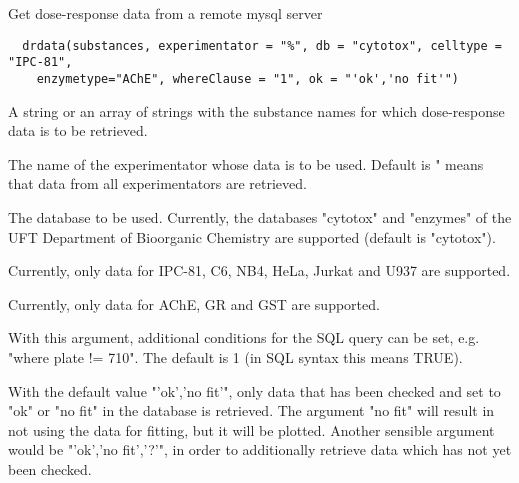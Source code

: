 \begin{Description}\relax
Get dose-response data from a remote mysql server
\end{Description}
\begin{Usage}
\begin{verbatim}
  drdata(substances, experimentator = "%", db = "cytotox", celltype = "IPC-81", 
    enzymetype="AChE", whereClause = "1", ok = "'ok','no fit'")
\end{verbatim}
\end{Usage}
\begin{Arguments}
\begin{ldescription}
\item[\code{substances}] A string or an array of strings with the substance names for
which dose-response data is to be retrieved.
\item[\code{experimentator}] The name of the experimentator whose data is to be used. Default is "
means that data from all experimentators are retrieved.
\item[\code{db}] The database to be used. Currently, the databases "cytotox" and "enzymes"
of the UFT Department of Bioorganic Chemistry are supported (default is
"cytotox").
\item[\code{celltype}] Currently, only data for IPC-81, C6, NB4, HeLa, Jurkat and U937 are supported.
\item[\code{enzymetype}] Currently, only data for AChE, GR and GST are supported.
\item[\code{whereClause}] With this argument, additional conditions for the SQL query can be set, 
e.g. "where plate != 710". The default is 1 (in SQL syntax this means TRUE).
\item[\code{ok}] With the default value "'ok','no fit'", only data that has been checked and set to "ok"
or "no fit" in the database is retrieved. The argument "no fit" will result
in not using the data for fitting, but it will be plotted.
Another sensible argument would be "'ok','no fit','?'", in order to additionally
retrieve data which has not yet been checked.
\end{ldescription}
\end{Arguments}
